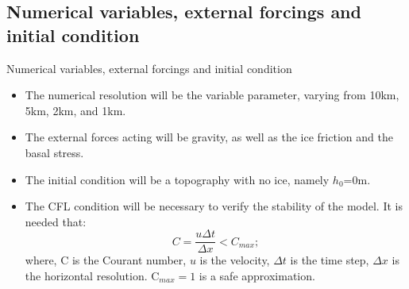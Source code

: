 \documentclass[11pt]{beamer}
\begin{document}
	\subsection{Numerical variables, external forcings and initial condition}
	\begin{frame}{Numerical variables, external forcings and initial condition}
		\begin{itemize}
			\item The numerical resolution will be the variable parameter, varying from 10km, 5km, 2km, and 1km.
			\item The external forces acting will be gravity, as well as the ice friction and the basal stress.
			\item The initial condition will be a topography with no ice, namely $h_0$=0m.
			\item The CFL condition will be necessary to verify the stability of the model. It is needed that:
			\begin{equation}
				C=\frac{u\Delta t}{\Delta x}<C_{max};
			\end{equation}
			where, C is the Courant number, $u$ is the velocity, $\Delta t$ is the time step, $\Delta x$ is the horizontal resolution. C$_{max}=1$ is a safe approximation.  
		\end{itemize}
	\end{frame}
\end{document}
